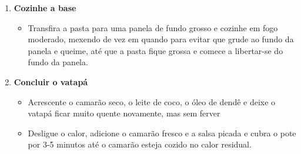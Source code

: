 \documentclass [11pt, letterpaper] {article}
\begin{document}
\begin {description}
\begin {enumerate}
\item {\bf Cozinhe a base}
\begin {itemize}
\item Transfira a pasta para uma panela de fundo grosso e cozinhe em fogo moderado, mexendo de vez em quando para evitar que grude ao fundo da panela e queime, até que a pasta fique grossa e comece a libertar-se do fundo da panela.
\end {itemize}

\item {\bf Concluir o vatap\'a}
\begin {itemize}
\item Acrescente o camarão seco, o leite de coco, o óleo de dend\^e e deixe o vatap\'a ficar muito quente novamente, mas sem ferver
\item Desligue o calor, adicione o camarão fresco e a salsa picada e cubra o pote por 3-5 minutos até o camarão esteja cozido no calor residual.
\end {itemize}

\end {enumerate}
\end {description}
\end{document}
